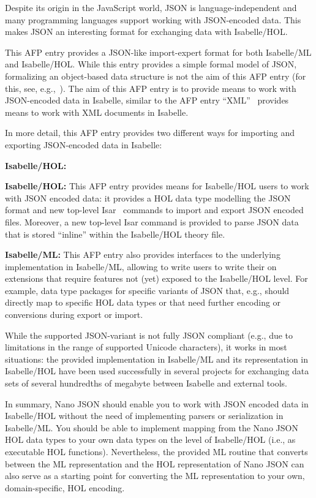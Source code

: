 \documentclass[11pt,DIV=12,a4paper,abstract=true,twoside=semi,openright]
{scrreprt}
\begin{document}
Despite its origin in the JavaScript world, JSON is language-independent and
many programming languages support working with JSON-encoded data. This makes
JSON an interesting format for exchanging data with Isabelle/HOL.
 
This AFP entry provides a JSON-like import-expert format for both Isabelle/ML
and Isabelle/HOL. While this entry provides a simple formal model of JSON,
formalizing an object-based data structure is not the aim of this AFP entry (for
this, see,
e.g.,~\cite{brucker.ea:extensible:2008-b,brucker.ea:afp-core-dom:2018}). The aim
of this AFP entry is to provide means to work with JSON-encoded data in
Isabelle, similar to the AFP entry ``XML''~\cite{sternagel.ea:xml:2014} provides
means to work with XML documents in Isabelle. 

In more detail, this AFP entry provides two different ways for importing and
exporting JSON-encoded data in Isabelle:
\begin{labeling}{\textbf{Isabelle/HOL:}}
\item[\textbf{Isabelle/HOL:}] This AFP entry provides means for Isabelle/HOL
      users to work with JSON encoded data: it provides a HOL data type
      modelling the JSON format and new top-level
      Isar~\cite{wenzel:isabelleisar:2002} commands to import and export JSON
      encoded files. Moreover, a new top-level Isar command is provided to parse
      JSON data that is stored ``inline'' within the Isabelle/HOL theory file. 
\item[\textbf{Isabelle/ML:}] This AFP entry also provides interfaces to the
      underlying implementation in Isabelle/ML, allowing to write users to
      write their on extensions that require features not (yet) exposed to the 
      Isabelle/HOL level. For example, data type packages for specific variants of JSON
      that, e.g., should directly map to specific HOL data types or that need
      further encoding or conversions during export or import. 
\end{labeling}

While the supported JSON-variant is not fully JSON compliant (e.g., due to
limitations in the range of supported Unicode characters), it works in most
situations: the provided implementation in Isabelle/ML and its representation in
Isabelle/HOL have been used successfully in several projects for exchanging data
sets of several hundredths of megabyte between Isabelle and external tools.


In summary, Nano JSON should enable you to work with JSON encoded data in
Isabelle/HOL without the need of implementing parsers or serialization in
Isabelle/ML. You should be able to implement mapping from the Nano JSON HOL data
types to your own data types on the level of Isabelle/HOL (i.e., as executable
HOL functions). Nevertheless, the provided ML routine that converts between the
ML representation and the HOL representation of Nano JSON can also serve as a
starting point for converting the ML representation to your own,
domain-specific, HOL encoding. 
\end{document}
